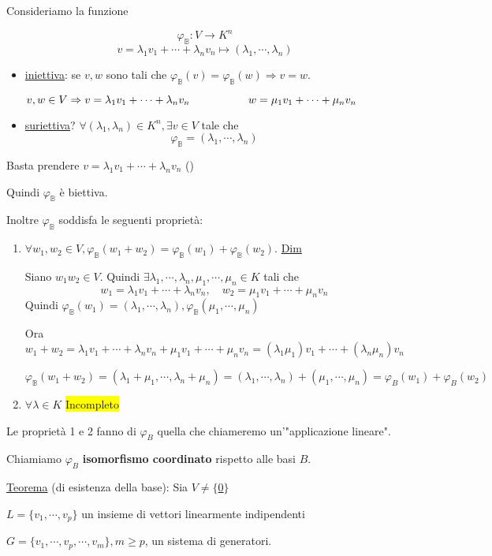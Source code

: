 \documentclass{article}
\newcommand{\hl}[1]{\colorbox{yellow}{#1}}
\newcommand{\ul}[1]{\underline{#1}}
\newcommand{\B}{\mathbb{B}}
\begin{document}
Consideriamo la funzione

$$\varphi_\B:V\rightarrow K^n$$
$$v=\lambda_1v_1+\cdots+\lambda_nv_n\mapsto(\lambda_1,\cdots,\lambda_n)$$
\begin{itemize}
	\item \ul{iniettiva}: se $v,w$ sono tali che $\varphi_\B(v)=\varphi_\B(w)\Rightarrow v=w$.

	  $v,w\in V\Rightarrow v=\lambda_1v_1+\cdots+\lambda_nv_n\\\qquad\qquad\quad\ w=\mu_1v_1+\cdots+\mu_nv_n$
	\item \ul{suriettiva}? $\forall(\lambda_1,\lambda_n)\in K^n,\exists v\in V$ tale che
	  $$\varphi_\B=(\lambda_1,\cdots,\lambda_n)$$
\end{itemize}
Basta prendere $v=\lambda_1v_1+\cdots+\lambda_nv_n$ (\boxed)

Quindi $\varphi_\B$ è biettiva.

Inoltre $\varphi_\B$ soddisfa le seguenti proprietà:
\begin{enumerate}
	\item $\forall w_1,w_2\in V,\varphi_\B(w_1+w_2)=\varphi_\B(w_1)+\varphi_\B(w_2)$.
	  \ul{Dim}

	  Siano $w_1w_2\in V$. Quindi $\exists\lambda_1,\cdots,\lambda_n,\mu_1,\cdots,\mu_n\in K$ tali che
	  $$w_1=\lambda_1v_1+\cdots+\lambda_nv_n,\quad w_2=\mu_1v_1+\cdots+\mu_nv_n$$
	  Quindi $\varphi_\B(w_1)=(\lambda_1,\cdots,\lambda_n),\varphi_\B(\mu_1,\cdots,\mu_n)$

	  Ora $w_1+w_2=\lambda_1v_1+\cdots+\lambda_nv_n+\mu_1v_1+\cdots+\mu_nv_n=(\lambda_1\mu_1)v_1+\cdots+(\lambda_n\mu_n)v_n$

	  $\varphi_\B(w_1+w_2)=(\lambda_1+\mu_1,\cdots,\lambda_n+\mu_n)=(\lambda_1,\cdots,\lambda_n)+(\mu_1,\cdots,\mu_n)=\varphi_B(w_1)+\varphi_B(w_2)$
	\item $\forall\lambda\in K$ \hl{Incompleto}
\end{enumerate}

Le proprietà 1 e 2 fanno di $\varphi_B$ quella che chiameremo un'"applicazione lineare".

Chiamiamo $\varphi_B$ \textbf{isomorfismo coordinato} rispetto alle basi $B$.

\ul{Teorema} (di esistenza della base): Sia $V\not=\{$\ul{0}$\}$

$L=\{v_1,\cdots,v_p\}$ un insieme di vettori linearmente indipendenti

$G=\{v_1,\cdots,v_p,\cdots,v_m\},m\ge p$, un sistema di generatori.
\end{document}

